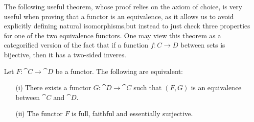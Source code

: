 The following useful theorem, whose proof relies on the axiom of choice, is very useful when proving that a functor is an equivalence, as it allows us to avoid explicitly defining natural isomorphisms,but instead to just check three properties for one of the two equivalence functors. One may view this theorem as a categorified version of the fact that if a function $f \colon C \to D$ between sets is bijective, then it has a two-sided inveres.
\begin{theorem}\label{thm:charequivalence}
Let $F \colon \cat{C} \to \cat{D}$ be a functor. The following are equivalent:
\begin{enumerate}
\item[(i)] There exists a functor $G \colon \cat{D} \to \cat{C}$ such that $(F,G)$ is an equivalence between $\cat{C}$ and $\cat{D}$.
\item[(ii)] The functor $F$ is full, faithful and essentially surjective.
\end{enumerate}
\end{theorem}
